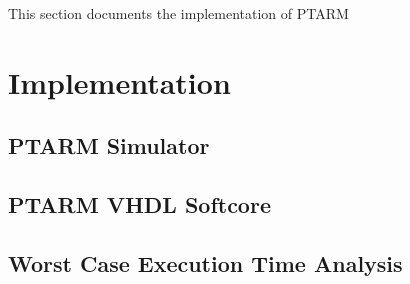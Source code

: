 This section documents the implementation of PTARM

\section{Implementation}
\subsection{PTARM Simulator}
\label{subsection:ptarm_sim}

\subsection{PTARM VHDL Softcore}
\label{subsection:ptarm_vhdl_softcore}

\subsection{Worst Case Execution Time Analysis}
\label{sec:wcet}




